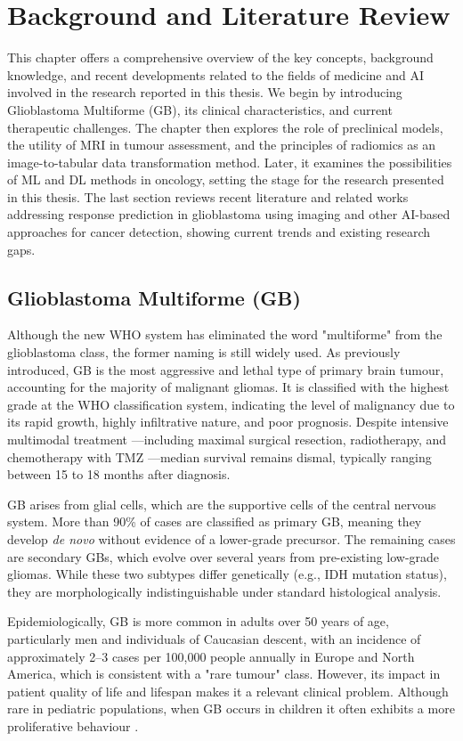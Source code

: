 \documentclass[12pt, a4paper]{report}
\begin{document}
\chapter{Background and Literature Review}
This chapter offers a comprehensive overview of the key concepts, background knowledge, and recent developments related to the fields of medicine and AI involved in the research reported in this thesis. We begin by introducing Glioblastoma Multiforme (GB), its clinical characteristics, and current therapeutic challenges. The chapter then explores the role of preclinical models, the utility of MRI in tumour assessment, and the principles of radiomics as an image-to-tabular data transformation method. Later, it examines the possibilities of ML and DL methods in oncology, setting the stage for the research presented in this thesis. The last section reviews recent literature and related works addressing response prediction in glioblastoma using imaging and other AI-based approaches for cancer detection, showing current trends and existing research gaps.

\section{Glioblastoma Multiforme (GB)}

Although the new WHO system has eliminated the word "multiforme" from the glioblastoma class, the former naming is still widely used. As previously introduced, GB is the most aggressive and lethal type of primary brain tumour, accounting for the majority of malignant gliomas. It is classified with the highest grade at the WHO classification system, indicating the level of malignancy due to its rapid growth, highly infiltrative nature, and poor prognosis. Despite intensive multimodal treatment —including maximal surgical resection, radiotherapy, and chemotherapy with TMZ —median survival remains dismal, typically ranging between 15 to 18 months after diagnosis.

GB arises from glial cells, which are the supportive cells of the central nervous system. More than 90\% of cases are classified as primary GB, meaning they develop \textit{de novo} without evidence of a lower-grade precursor. The remaining cases are secondary GBs, which evolve over several years from pre-existing low-grade gliomas. While these two subtypes differ genetically (e.g., IDH mutation status), they are morphologically indistinguishable under standard histological analysis.

Epidemiologically, GB is more common in adults over 50 years of age, particularly men and individuals of Caucasian descent, with an incidence of approximately 2–3 cases per 100,000 people annually in Europe and North America, which is consistent with a "rare tumour" class. However, its impact in patient quality of life and lifespan makes it a relevant clinical problem. Although rare in pediatric populations, when GB occurs in children it often exhibits a more proliferative behaviour \cite{Urbańska2014}.
\end{document}
